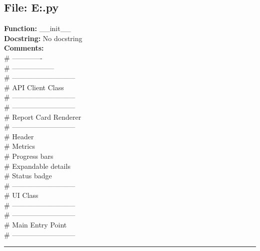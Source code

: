 {\subsection*{File: E:\project\capstone\frontend\view.py}
\textbf{Function:} __init__\\
\textbf{Docstring:} No docstring\\
\textbf{Comments:}\\
# -------------\\
# ------------------\\
# ---------------------------\\
# API Client Class\\
# ---------------------------\\
# ---------------------------\\
# Report Card Renderer\\
# ---------------------------\\
# Header\\
# Metrics\\
# Progress bars\\
# Expandable details\\
# Status badge\\
# ---------------------------\\
# UI Class\\
# ---------------------------\\
# ---------------------------\\
# Main Entry Point\\
# ---------------------------\\

\hrule

}

